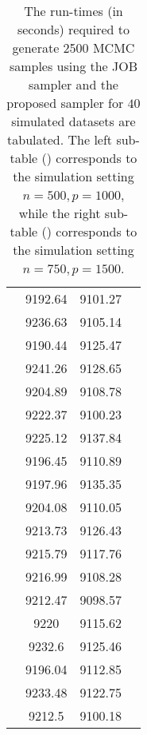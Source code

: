 \documentclass[noinfoline,11pt]{imsart}
\numberwithin{equation}{section}
\theoremstyle{plain}
\begin{document}
\begin{table}[hbt!]
\begin{subtable}{0.45\textwidth}
\begin{tabular}{|@{}cccc@{}|}
 & 9192.64       & 9101.27           &  \\
 & 9236.63       & 9105.14           &  \\
 & 9190.44       & 9125.47           &  \\
 & 9241.26       & 9128.65           &  \\
 & 9204.89       & 9108.78           &  \\
 & 9222.37       & 9100.23           &  \\
 & 9225.12       & 9137.84           &  \\
 & 9196.45       & 9110.89           &  \\
 & 9197.96       & 9135.35           &  \\
 & 9204.08       & 9110.05           &  \\
 & 9213.73       & 9126.43           &  \\
 & 9215.79       & 9117.76           &  \\
 & 9216.99       & 9108.28           &  \\
 & 9212.47       & 9098.57           &  \\
 & 9220          & 9115.62           &  \\
 & 9232.6        & 9125.46           &  \\
 & 9196.04       & 9112.85           &  \\
 & 9233.48       & 9122.75           &  \\
 & 9212.5        & 9100.18           &  \\ \bottomrule
\end{tabular}
\caption{}
\label{tab:table1_d}
\end{subtable}%
\caption{\footnotesize The run-times (in seconds) required to generate 2500 MCMC samples using the JOB sampler and the proposed sampler for $40$ simulated datasets are tabulated. The left  sub-table () corresponds to the simulation setting $n=500, p=1000$,  while the right sub-table () corresponds to the simulation setting $n=750, p=1500$. }
\label{tab:table1}
\end{table}
\end{document}
